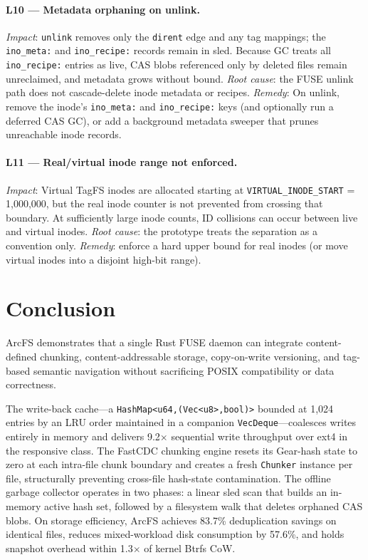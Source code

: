 \documentclass[5p,times]{elsarticle}
\begin{document}
\paragraph{L10 --- Metadata orphaning on unlink.}
\textit{Impact}: \texttt{unlink} removes only the \texttt{dirent} edge
and any tag mappings; the \texttt{ino\_meta:} and \texttt{ino\_recipe:}
records remain in sled.  Because GC treats all \texttt{ino\_recipe:}
entries as live, CAS blobs referenced only by deleted files remain
unreclaimed, and metadata grows without bound.  \textit{Root cause}:
the FUSE unlink path does not cascade-delete inode metadata or recipes.
\textit{Remedy}: On unlink, remove the inode's \texttt{ino\_meta:} and
\texttt{ino\_recipe:} keys (and optionally run a deferred CAS GC), or
add a background metadata sweeper that prunes unreachable inode records.

\paragraph{L11 --- Real/virtual inode range not enforced.}
\textit{Impact}: Virtual TagFS inodes are allocated starting at
\texttt{VIRTUAL\_INODE\_START} = 1,000,000, but the real inode counter
is not prevented from crossing that boundary.  At sufficiently large
inode counts, ID collisions can occur between live and virtual inodes.
\textit{Root cause}: the prototype treats the separation as a convention
only.  \textit{Remedy}: enforce a hard upper bound for real inodes (or
move virtual inodes into a disjoint high-bit range).

\section{Conclusion}

ArcFS demonstrates that a single Rust FUSE daemon can integrate
content-defined chunking, content-addressable storage, copy-on-write
versioning, and tag-based semantic navigation without sacrificing POSIX
compatibility or data correctness.

The write-back cache---a \texttt{HashMap\textless{}u64,(Vec\textless{}u8\textgreater{},bool)\textgreater{}}
bounded at 1,024 entries by an LRU order maintained in a companion
\texttt{VecDeque}---coalesces writes entirely in memory and delivers
9.2$\times$ sequential write throughput over ext4 in the responsive class.
The FastCDC chunking engine resets its Gear-hash state to zero at each
intra-file chunk boundary and creates a fresh \texttt{Chunker} instance
per file, structurally preventing cross-file hash-state contamination.
The offline garbage collector operates in two phases: a linear sled
scan that builds an in-memory active hash set, followed by a filesystem
walk that deletes orphaned CAS blobs.  On storage efficiency, ArcFS
achieves 83.7\% deduplication savings on identical files, reduces
mixed-workload disk consumption by 57.6\%, and holds snapshot overhead
within 1.3$\times$ of kernel Btrfs CoW.
\end{document}
